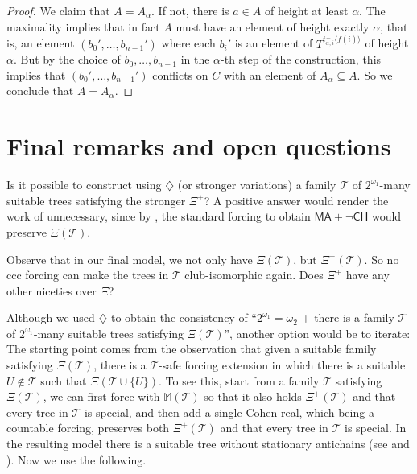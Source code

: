\documentclass[a4paper,noamsfonts]{amsart}
\theoremstyle{definition}
\newcommand{\seb}{\subseteq}
\newcommand{\tup}[1]{\langle#1\rangle}
\newcommand{\CH}{\textsf{CH}}
\newcommand{\MA}{\textsf{MA}}
\newcommand{\1}{\mathbf{1}}
\newcommand{\dia}{\diamondsuit}
\newcommand{\M}{\mathbb{M}}
\newcommand{\T}{\mathcal{T}}
\newcommand{\prop}{\Xi}
\newcommand{\propp}{\prop^{+}}
\begin{document}
\begin{proof}
  We claim that $A = A_{\alpha}$. If not, there is $a \in A$ of
  height at least $\alpha$. The maximality implies that in fact
  $A$ must have an element of height exactly $\alpha$,
  that is, an element $(b_{0}',\dots,b_{n-1}')$ where
  each $b_{i}'$ is an element of $T^{t_{\alpha,i}^{\frown}\tup{f(i)}}$
  of height $\alpha$. But 
  by the choice of $b_{0},\dots,b_{n-1}$ in
  the $\alpha$-th step of the construction, this implies that
  $(b_{0}',\dots,b_{n-1}')$ conflicts on $C$
  with an element of $A_{\alpha} \seb A$.
  So we conclude that $A = A_{\alpha}$.
\end{proof}

\section{Final remarks and open questions}

Is it possible to construct using $\dia$ (or stronger variations) a family
$\T$ of $2^{\omega_{1}}$-many suitable trees satisfying the stronger $\propp$?
A positive answer would render the work of 
unnecessary, since by , the standard forcing
to obtain $\MA + \neg \CH$ would preserve $\prop(\T)$.

Observe that in our final model, we not only have $\prop(\T)$, but
$\propp(\T)$. So no ccc forcing can make the trees in $\T$
club-isomorphic again. Does $\propp$ have any other niceties over $\prop$?

Although we used $\dia$ to obtain the consistency of
``$2^{\omega_{1}} = \omega_{2}$
+ there is a family $\T$ of $2^{\omega_{1}}$-many suitable trees
satisfying $\prop(\T)$'', another option would be to iterate: The
starting point comes from the observation that given a suitable family satisfying
$\prop(\T)$, there is a $\T$-safe forcing extension in which there
is a suitable $U \notin \T$ such that $\prop(\T \cup \{U\})$. To see this,
start from a family $\T$ satisfying $\prop(\T)$,
we can first force with $\M(\T)$ so that it also holds $\propp(\T)$ and
that every
tree in $\T$ is special, and then add a single Cohen real, which
being a countable forcing, preserves both $\propp(\T)$ and that every
tree in $\T$ is special. In the resulting
model there is a suitable tree without stationary antichains
(see \cite{TodorcevicWalks}
and \cite{HrusakMartinez}). Now we use the following.
 
\end{document}
